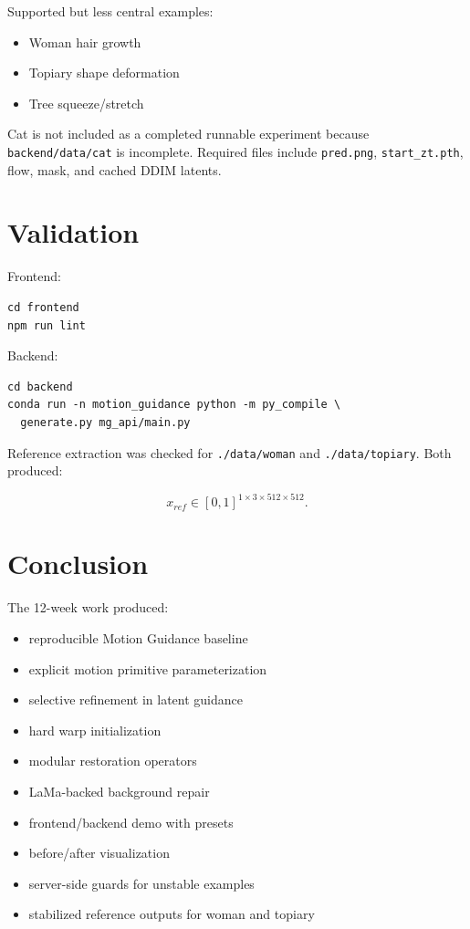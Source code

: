 \documentclass[11pt,a4paper]{article}
\begin{document}
Supported but less central examples:

\begin{itemize}
  \item Woman hair growth
  \item Topiary shape deformation
  \item Tree squeeze/stretch
\end{itemize}

Cat is not included as a completed runnable experiment because \texttt{backend/data/cat} is incomplete. Required files include \texttt{pred.png}, \texttt{start\_zt.pth}, flow, mask, and cached DDIM latents.

\section{Validation}

Frontend:

\begin{verbatim}
cd frontend
npm run lint
\end{verbatim}

Backend:

\begin{verbatim}
cd backend
conda run -n motion_guidance python -m py_compile \
  generate.py mg_api/main.py
\end{verbatim}

Reference extraction was checked for \texttt{./data/woman} and \texttt{./data/topiary}. Both produced:

\begin{equation}
x_{ref}\in[0,1]^{1\times 3\times 512\times 512}.
\end{equation}

\section{Conclusion}

The 12-week work produced:

\begin{itemize}
  \item reproducible Motion Guidance baseline
  \item explicit motion primitive parameterization
  \item selective refinement in latent guidance
  \item hard warp initialization
  \item modular restoration operators
  \item LaMa-backed background repair
  \item frontend/backend demo with presets
  \item before/after visualization
  \item server-side guards for unstable examples
  \item stabilized reference outputs for woman and topiary
\end{itemize}
\end{document}
